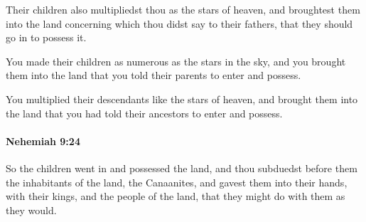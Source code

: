 			\begin{versebox}
					\item[BHS] 
					\item[LXX] 
					\item[ASV] Their children also multipliedst thou as the stars of heaven, and broughtest them into the land concerning which thou didst say to their fathers, that they should go in to possess it.
					\item[NIV] You made their children as numerous as the stars in the sky, and you brought them into the land that you told their parents to enter and possess.
					\item[NRSV] You multiplied their descendants like the stars of heaven, and brought them into the land that you had told their ancestors to enter and possess.
			\end{versebox}

		\paragraph{Nehemiah 9:24} %
			\label{NEHEMIAH-9-24}

			So the children went in and possessed the land, and thou subduedst before them the inhabitants of the land, the Canaanites, and gavest them into their hands, with their kings, and the people of the land, that they might do with them as they would.

